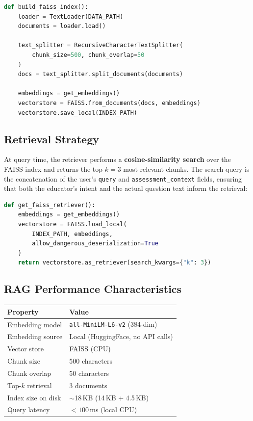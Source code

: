 \documentclass[12pt, a4paper, twoside]{article}
\newcommand{\code}[1]{\texttt{#1}}
\begin{document}
\begin{lstlisting}[language=Python,
  caption={FAISS index construction (\code{agent/rag.py}).}]
def build_faiss_index():
    loader = TextLoader(DATA_PATH)
    documents = loader.load()

    text_splitter = RecursiveCharacterTextSplitter(
        chunk_size=500, chunk_overlap=50
    )
    docs = text_splitter.split_documents(documents)

    embeddings = get_embeddings()
    vectorstore = FAISS.from_documents(docs, embeddings)
    vectorstore.save_local(INDEX_PATH)
\end{lstlisting}

\subsection{Retrieval Strategy}

At query time, the retriever performs a \textbf{cosine-similarity
search} over the FAISS index and returns the top $k=3$ most relevant
chunks. The search query is the concatenation of the user's
\code{query} and \code{assessment\_context} fields, ensuring that
both the educator's intent and the actual question text inform the
retrieval:

\begin{lstlisting}[language=Python,
  caption={Retriever loading (\code{agent/rag.py}).}]
def get_faiss_retriever():
    embeddings = get_embeddings()
    vectorstore = FAISS.load_local(
        INDEX_PATH, embeddings,
        allow_dangerous_deserialization=True
    )
    return vectorstore.as_retriever(search_kwargs={"k": 3})
\end{lstlisting}

\subsection{RAG Performance Characteristics}

\begin{center}
\renewcommand{\arraystretch}{1.3}
\begin{tabular}{ll}
    \toprule
    \textbf{Property} & \textbf{Value} \\
    \midrule
    Embedding model        & \code{all-MiniLM-L6-v2} (384-dim) \\
    Embedding source       & Local (HuggingFace, no API calls) \\
    Vector store           & FAISS (CPU) \\
    Chunk size             & 500 characters \\
    Chunk overlap          & 50 characters \\
    Top-$k$ retrieval      & 3 documents \\
    Index size on disk     & $\sim$18\,KB (14\,KB + 4.5\,KB) \\
    Query latency          & $< 100$\,ms (local CPU) \\
    \bottomrule
\end{tabular}
\end{center}
\end{document}
